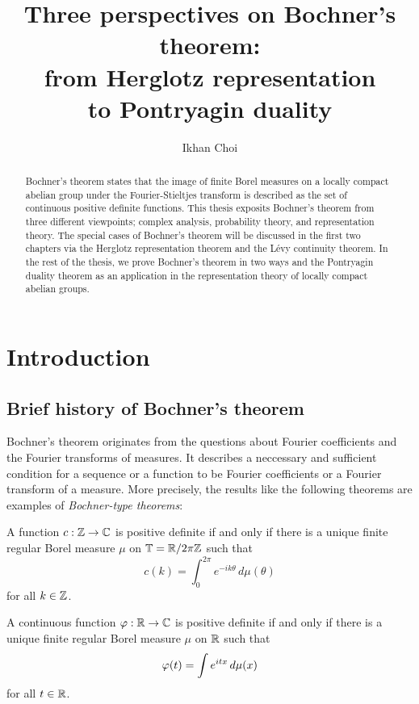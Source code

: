 \documentclass[a4paper]{article}
\title{Three perspectives on Bochner's theorem:\\from Herglotz representation\\to Pontryagin duality}
\author{Ikhan Choi}
\date{}
\begin{document}
\maketitle
\begin{abstract}
Bochner's theorem states that the image of finite Borel measures on a locally compact abelian group under the Fourier-Stieltjes transform is described as the set of continuous positive definite functions.
This thesis exposits Bochner's theorem from three different viewpoints; complex analysis, probability theory, and representation theory.
The special cases of Bochner's theorem will be discussed in the first two chapters via the Herglotz representation theorem and the L\'evy continuity theorem.
In the rest of the thesis, we prove Bochner's theorem in two ways and the Pontryagin duality theorem as an application in the representation theory of locally compact abelian groups.
\end{abstract}
\tableofcontents










\newpage
\section{Introduction}



\subsection{Brief history of Bochner's theorem}

Bochner's theorem originates from the questions about Fourier coefficients and the Fourier transforms of measures.
It describes a neccessary and sufficient condition for a sequence or a function to be Fourier coefficients or a Fourier transform of a measure.
More precisely, the results like the following theorems are examples of \emph{Bochner-type theorems}:
\begin{thm}
A function $c:\mathbb{Z}\to\mathbb{C}$ is positive definite if and only if there is a unique finite regular Borel measure $\mu$ on $\mathbb{T}=\mathbb{R}/2\pi\mathbb{Z}$ such that
\[c(k)=\int_0^{2\pi}e^{-ik\theta}\,d\mu(\theta)\]
for all $k\in\mathbb{Z}$.
\end{thm}
\begin{thm}
A continuous function $\varphi:\mathbb{R}\to\mathbb{C}$ is positive definite if and only if there is a unique finite regular Borel measure $\mu$ on $\mathbb{R}$ such that
\[\varphi(t)=\int e^{itx}\,d\mu(x)\]
for all $t\in\mathbb{R}$.
\end{thm}
\end{document}
